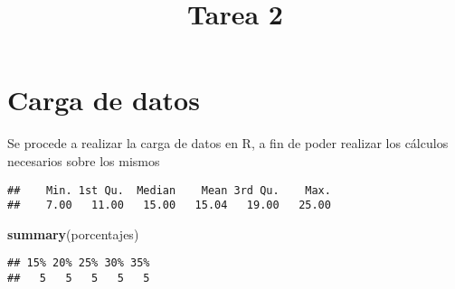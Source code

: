 \documentclass[]{article}
\title{Tarea 2}
\author{}
\date{}
\newenvironment{Shaded}{\begin{snugshade}}{\end{snugshade}}
\newcommand{\KeywordTok}[1]{\textcolor[rgb]{0.13,0.29,0.53}{\textbf{#1}}}
\newcommand{\DataTypeTok}[1]{\textcolor[rgb]{0.13,0.29,0.53}{#1}}
\newcommand{\DecValTok}[1]{\textcolor[rgb]{0.00,0.00,0.81}{#1}}
\newcommand{\StringTok}[1]{\textcolor[rgb]{0.31,0.60,0.02}{#1}}
\newcommand{\NormalTok}[1]{#1}
\begin{document}
\maketitle

\section{Carga de datos}\label{carga-de-datos}

Se procede a realizar la carga de datos en R, a fin de poder realizar
los cálculos necesarios sobre los mismos

\begin{Shaded}
\end{Shaded}

\begin{verbatim}
##    Min. 1st Qu.  Median    Mean 3rd Qu.    Max. 
##    7.00   11.00   15.00   15.04   19.00   25.00
\end{verbatim}

\begin{Shaded}
\begin{Highlighting}[]
\KeywordTok{summary}\NormalTok{(porcentajes)}
\end{Highlighting}
\end{Shaded}

\begin{verbatim}
## 15% 20% 25% 30% 35% 
##   5   5   5   5   5
\end{verbatim}
\end{document}
